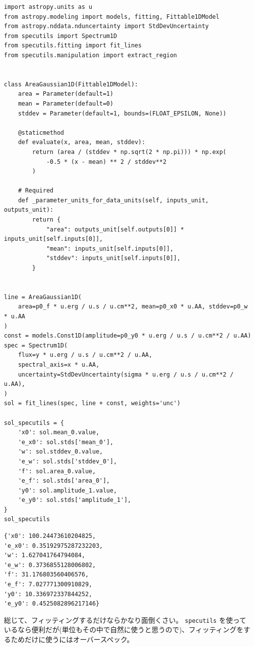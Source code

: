 \documentclass[a4paper, 9pt, notitlepage, uplatex, dvipdfmx]{jsarticle}
\begin{document}
\begin{verbatim}
import astropy.units as u
from astropy.modeling import models, fitting, Fittable1DModel
from astropy.nddata.nduncertainty import StdDevUncertainty
from specutils import Spectrum1D
from specutils.fitting import fit_lines
from specutils.manipulation import extract_region


class AreaGaussian1D(Fittable1DModel):
    area = Parameter(default=1)
    mean = Parameter(default=0)
    stddev = Parameter(default=1, bounds=(FLOAT_EPSILON, None))

    @staticmethod
    def evaluate(x, area, mean, stddev):
        return (area / (stddev * np.sqrt(2 * np.pi))) * np.exp(
            -0.5 * (x - mean) ** 2 / stddev**2
        )

    # Required
    def _parameter_units_for_data_units(self, inputs_unit, outputs_unit):
        return {
            "area": outputs_unit[self.outputs[0]] * inputs_unit[self.inputs[0]],
            "mean": inputs_unit[self.inputs[0]],
            "stddev": inputs_unit[self.inputs[0]],
        }


line = AreaGaussian1D(
    area=p0_f * u.erg / u.s / u.cm**2, mean=p0_x0 * u.AA, stddev=p0_w * u.AA
)
const = models.Const1D(amplitude=p0_y0 * u.erg / u.s / u.cm**2 / u.AA)
spec = Spectrum1D(
    flux=y * u.erg / u.s / u.cm**2 / u.AA,
    spectral_axis=x * u.AA,
    uncertainty=StdDevUncertainty(sigma * u.erg / u.s / u.cm**2 / u.AA),
)
sol = fit_lines(spec, line + const, weights='unc')

sol_specutils = {
    'x0': sol.mean_0.value,
    'e_x0': sol.stds['mean_0'],
    'w': sol.stddev_0.value,
    'e_w': sol.stds['stddev_0'],
    'f': sol.area_0.value,
    'e_f': sol.stds['area_0'],
    'y0': sol.amplitude_1.value,
    'e_y0': sol.stds['amplitude_1'],
}
sol_specutils
\end{verbatim}

\label{}
\begin{verbatim}
{'x0': 100.24473610204825,
'e_x0': 0.35192975287232203,
'w': 1.627041764794084,
'e_w': 0.3736855128006802,
'f': 31.176803560406576,
'e_f': 7.027771300910829,
'y0': 10.336972337844252,
'e_y0': 0.4525082896217146}
\end{verbatim}

総じて、フィッティングするだけならかなり面倒くさい。
\texttt{specutils} を使っているなら便利だが(単位もその中で自然に使うと思うので)、フィッティングをするためだけに使うにはオーバースペック。
\end{document}
